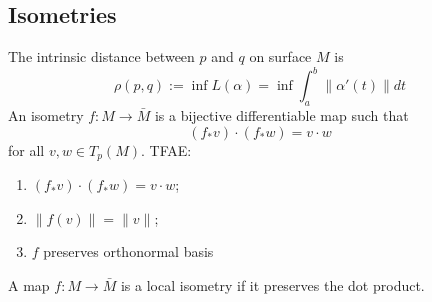 \documentclass{article}
\newcommand{\assign}{:=}
\newenvironment{enumeratenumeric}{\begin{enumerate}[1.] }{\end{enumerate}}
\begin{document}
\subsection{Isometries}

The intrinsic distance between $p$ and $q$ on surface $M$ is
\begin{equation}
  \rho (p, q) \assign \inf L (\alpha) = \inf \int^b_a \| \alpha' (t) \| d t
\end{equation}
An isometry $f : M \rightarrow \bar{M}$ is a bijective differentiable map such
that
\[ (f_{\ast} v) \cdot (f_{\ast} w) = v \cdot w \]
for all $v, w \in T_p (M)$. TFAE:
\begin{enumeratenumeric}
  \item $(f_{\ast} v) \cdot (f_{\ast} w) = v \cdot w$;
  
  \item $\| f (v) \| = \| v \|$;
  
  \item $f$ preserves orthonormal basis
\end{enumeratenumeric}
A map $f : M \rightarrow \bar{M}$ is a local isometry if it preserves the dot
product.

{}

{}
\end{document}

